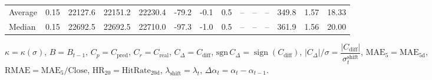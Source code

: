 \begin{threeparttable}
{\begin{tabular}{lrrrrrrrrrrrrr}
Average &     0.15 & 22127.6 & 22151.2 & 22230.4 &      -79.2 &                     -0.1 &                 0.5 &         -- &        -- &             -- &            349.8 &            1.57 &                  18.33 \\
 Median &     0.15 & 22692.5 & 22692.5 & 22710.0 &      -97.3 &                     -1.0 &                 0.5 &         -- &        -- &             -- &            361.9 &            1.56 &                  20.00 \\
\bottomrule
\end{tabular}
}
\begin{tablenotes}\footnotesize
\item $\kappa=\kappa(\sigma)$, $B=B_{t-1}$, $C_p=C_{\text{pred}}$, $C_r=C_{\text{real}}$, $C_\Delta=C_{\text{diff}}$, $\mathrm{sgn}\,C_\Delta=\operatorname{sign}(C_{\text{diff}})$, $|C_\Delta|/\sigma=\dfrac{|C_{\text{diff}}|}{\sigma_t^{\text{shift}}}$, $\mathrm{MAE}_5=\mathrm{MAE}_{5\text{d}}$, $\mathrm{RMAE}= \mathrm{MAE}_5 / \text{Close}$, $\mathrm{HR}_{20}=\mathrm{HitRate}_{20\text{d}}$, 
$\lambda_{\text{shift}}=\lambda_t$, 
$\Delta\alpha_t=\alpha_t-\alpha_{t-1}$.
\end{tablenotes}
\end{threeparttable}
\endgroup

